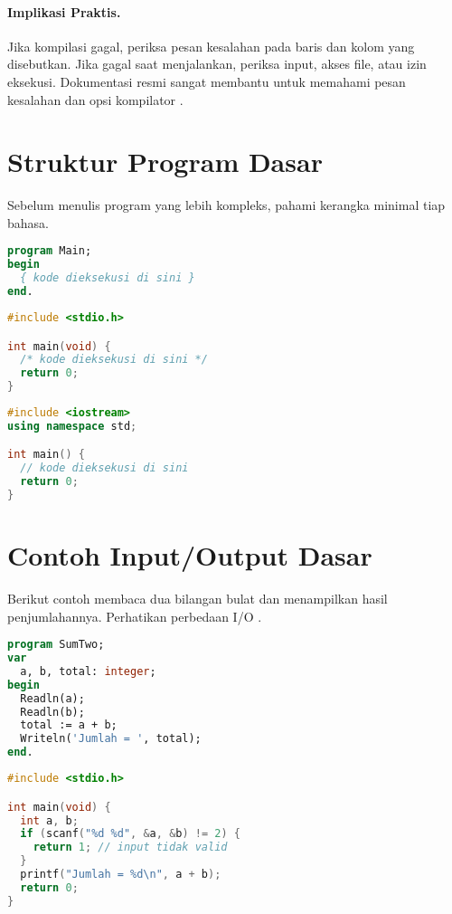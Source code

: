 \documentclass[../main.tex]{subfiles}
\begin{document}
\paragraph{Implikasi Praktis.} Jika kompilasi gagal, periksa pesan kesalahan pada baris dan kolom yang disebutkan. Jika gagal saat menjalankan, periksa input, akses file, atau izin eksekusi. Dokumentasi resmi sangat membantu untuk memahami pesan kesalahan dan opsi kompilator \parencite{free-pascal-docs,gnu-c-manual}.

\section{Struktur Program Dasar}
Sebelum menulis program yang lebih kompleks, pahami kerangka minimal tiap bahasa.

\begin{lstlisting}[language=Pascal, caption={Kerangka program Pascal}]
program Main;
begin
  { kode dieksekusi di sini }
end.
\end{lstlisting}

\begin{lstlisting}[language=C, caption={Kerangka program C}]
#include <stdio.h>

int main(void) {
  /* kode dieksekusi di sini */
  return 0;
}
\end{lstlisting}

\begin{lstlisting}[language=C++, caption={Kerangka program C++}]
#include <iostream>
using namespace std;

int main() {
  // kode dieksekusi di sini
  return 0;
}
\end{lstlisting}

\section{Contoh Input/Output Dasar}
Berikut contoh membaca dua bilangan bulat dan menampilkan hasil penjumlahannya. Perhatikan perbedaan I/O \parencite{w3pascal-io,gnu-c-manual,cpp-reference}.

\begin{lstlisting}[language=Pascal, caption={Menjumlah dua bilangan pada Pascal}]
program SumTwo;
var
  a, b, total: integer;
begin
  Readln(a);
  Readln(b);
  total := a + b;
  Writeln('Jumlah = ', total);
end.
\end{lstlisting}

\begin{lstlisting}[language=C, caption={Menjumlah dua bilangan pada C}]
#include <stdio.h>

int main(void) {
  int a, b;
  if (scanf("%d %d", &a, &b) != 2) {
    return 1; // input tidak valid
  }
  printf("Jumlah = %d\n", a + b);
  return 0;
}
\end{lstlisting}
\end{document}
